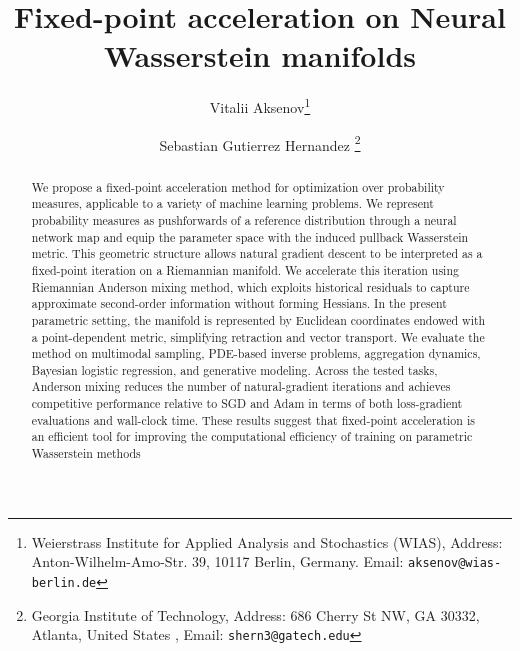 \documentclass{article} %
\title{Fixed-point acceleration on Neural Wasserstein manifolds}
\author{
    Vitalii Aksenov\thanks{
        Weierstrass Institute for Applied Analysis and Stochastics (WIAS), 
        Address: Anton-Wilhelm-Amo-Str. 39,
        10117 Berlin, Germany.
        Email: \texttt{aksenov@wias-berlin.de}
    }
    \and
    Sebastian Gutierrez Hernandez \thanks{
        Georgia Institute of Technology, 
        Address: 686 Cherry St NW, 
         GA 30332, Atlanta, United States , 
        Email: \texttt{shern3@gatech.edu}
    }
}
\numberwithin{equation}{subsection}
\numberwithin{theorem}{section}
\begin{document}
\maketitle

\begin{abstract}
    We propose a fixed-point acceleration method for optimization over probability measures, applicable to a variety of machine learning problems.
    We represent probability measures as pushforwards of a reference distribution through a neural network map and equip the parameter space with the induced pullback Wasserstein metric.
    This geometric structure allows natural gradient descent to be interpreted as a fixed-point iteration on a Riemannian manifold.
    We accelerate this iteration using Riemannian Anderson mixing method, which exploits historical residuals to capture approximate second-order information without forming Hessians.
    In the present parametric setting, the manifold is represented by Euclidean coordinates endowed with a point-dependent metric, simplifying retraction and vector transport.
    We evaluate the method on multimodal sampling, PDE-based inverse problems, aggregation dynamics, Bayesian logistic regression, and generative modeling.
    Across the tested tasks, Anderson mixing reduces the number of natural-gradient iterations and achieves competitive performance relative to SGD and Adam in terms of both loss-gradient evaluations and wall-clock time.
    These results suggest that fixed-point acceleration is an efficient tool for improving the computational efficiency of training on parametric Wasserstein methods

\end{abstract}
\end{document}
